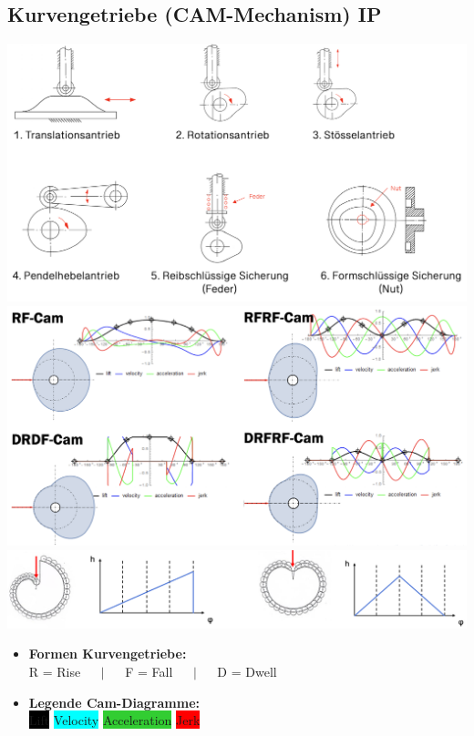 \subsection{Kurvengetriebe (CAM-Mechanism) \hfill IP}
\begin{footnotesize}
    \begin{center}
        \includegraphics[width = 0.8\linewidth]{src/images/MAEIP_Kurvengetriebe}
        \includegraphics[width = 0.75\linewidth]{src/images/MAEIP_VariationKurvenform}
        \includegraphics[width = 0.8\linewidth]{src/images/MAEIP_ArchimedesKurvenform}
    \end{center}
    \begin{itemize}
        \item \textbf{Formen Kurvengetriebe:} 
        \\ R = Rise $\quad \mid \quad$ F = Fall $\quad \mid \quad$ D = Dwell
        \item \textbf{Legende Cam-Diagramme:}
        \\ \colorbox{Black}{\color{white} Lift} \colorbox{Cyan}{Velocity} \colorbox{LimeGreen}{Acceleration} \colorbox{Red}{Jerk}
    \end{itemize}
\end{footnotesize}